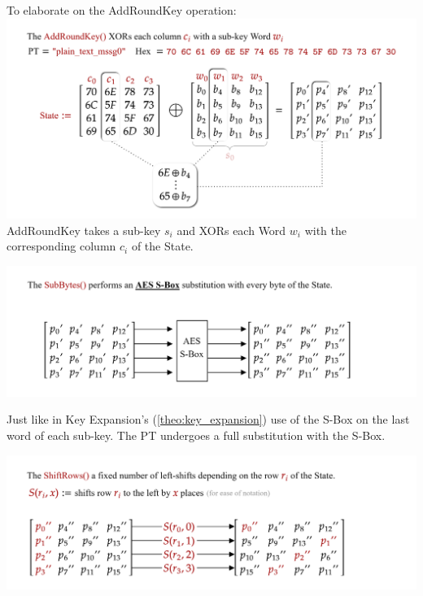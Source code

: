 \noindent
To elaborate on the AddRoundKey operation:\\

\hspace{-3em}
\includegraphics[width=1.1\textwidth]{Sections/sec/enc/aes/trans/add.png}
AddRoundKey takes a sub-key $s_i$ and XORs each Word $w_i$ with the corresponding column $c_i$ of the State.
\vspace{5em}

\hspace{-3em}
\includegraphics[width=1.1\textwidth]{Sections/sec/enc/aes/trans/sub.png}

\noindent
Just like in Key Expansion's (\ref{theo:key_expansion}) use of the S-Box on the last word of each sub-key. The PT undergoes 
a full substitution with the S-Box.

\newpage 

\hspace{-3em}
\includegraphics[width=1.1\textwidth]{Sections/sec/enc/aes/trans/shift.png}
\vspace{-1em}



